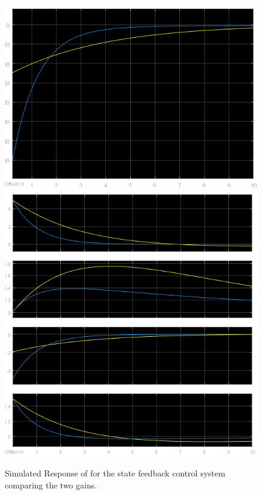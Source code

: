 \documentclass[]{article}
\begin{document}
			\begin{figure}[p]
				\centering
				\includegraphics[width=0.7\linewidth]{Fig/PSD_ControlSignal_2}
				\includegraphics[width=0.7\linewidth]{Fig/PSD_SystemResponse_2}
				\caption{Simulated Response of for the state feedback control system comparing the two gains.}
				\label{fig:psdsimulation2}
			\end{figure}
	\newpage
\end{document}
